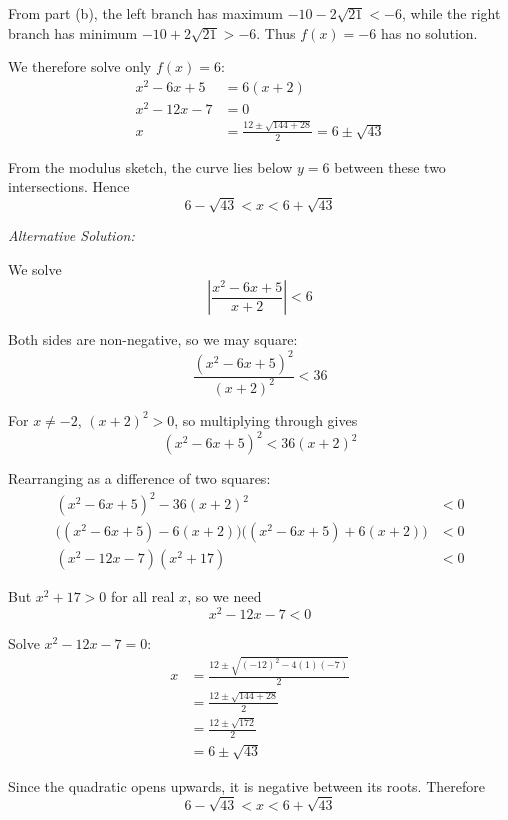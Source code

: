 \documentclass[leqno]{article}
\begin{document}
\begin{enumerate}[
  label=\textbf{\arabic*.},
  leftmargin=*,
  topsep=0pt,
  partopsep=0pt,
  parsep=0pt
]
\begin{djsSolution}
\begin{enumerate}[label=\textbf{(\alph*)}]
  From part (b), the left branch has maximum \(-10-2\sqrt{21}<-6\), while the right branch has minimum \(-10+2\sqrt{21}>-6\). Thus \(f(x)=-6\) has no solution.

  We therefore solve only \(f(x)=6\):
  \begin{align*}
  x^2-6x+5&=6(x+2)\\
  x^2-12x-7&=0\\
  x&=\frac{12\pm\sqrt{144+28}}{2}=6\pm\sqrt{43}
  \end{align*}

  From the modulus sketch, the curve lies below \(y=6\) between these two intersections. Hence
  \[
  6-\sqrt{43}<x<6+\sqrt{43}
  \]

{\setlength{\parskip}{8pt}%
\textit{Alternative Solution:}

We solve
\[
\left|\frac{x^2-6x+5}{x+2}\right|<6
\]

Both sides are non-negative, so we may square:
  \[
  \frac{(x^2-6x+5)^2}{(x+2)^2}<36
  \]

  For \(x\neq -2\), \((x+2)^2>0\), so multiplying through gives
  \[
  (x^2-6x+5)^2<36(x+2)^2
  \]

  Rearranging as a difference of two squares:
  \begin{align*}
  (x^2-6x+5)^2-36(x+2)^2&<0 \\
  \bigl((x^2-6x+5)-6(x+2)\bigr)\bigl((x^2-6x+5)+6(x+2)\bigr)&<0 \\
  (x^2-12x-7)(x^2+17)&<0
  \end{align*}

  But \(x^2+17>0\) for all real \(x\), so we need
  \[
  x^2-12x-7<0
  \]

  Solve \(x^2-12x-7=0\):
  \begin{align*}
  x&=\frac{12\pm\sqrt{(-12)^2-4(1)(-7)}}{2} \\
   &=\frac{12\pm\sqrt{144+28}}{2} \\
   &=\frac{12\pm\sqrt{172}}{2} \\
   &=6\pm\sqrt{43}
  \end{align*}

  Since the quadratic opens upwards, it is negative between its roots. Therefore
  \[
  6-\sqrt{43}<x<6+\sqrt{43}
  \]

\par}
\end{enumerate}
\end{djsSolution}


\newpage

\questionitem


\end{enumerate}
\end{document}
